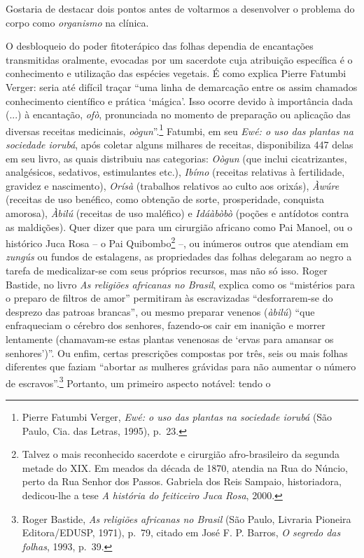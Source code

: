 Gostaria de destacar dois pontos antes de voltarmos a desenvolver o
problema do corpo como \emph{organismo} na clínica.

O desbloqueio do poder fitoterápico das folhas dependia de encantações
transmitidas oralmente, evocadas por um sacerdote cuja atribuição
específica é o conhecimento e utilização das espécies vegetais. É como
explica Pierre Fatumbi Verger: seria até difícil traçar ``uma linha de
demarcação entre os assim chamados conhecimento científico e prática
`mágica'. Isso ocorre devido à importância dada (...) à encantação,
\emph{ofò}, pronunciada no momento de preparação ou aplicação das
diversas receitas medicinais, \emph{oògun}''.\footnote{Pierre Fatumbi
  Verger, \emph{Ewé: o uso das plantas na sociedade iorubá} (São Paulo,
  Cia. das Letras, 1995), p.~23.} Fatumbi, em seu \emph{Ewé: o uso das
plantas na sociedade iorubá}, após coletar alguns milhares de receitas,
disponibiliza 447 delas em seu livro, as quais distribuiu nas
categorias: \emph{Oògun} (que inclui cicatrizantes, analgésicos,
sedativos, estimulantes etc.), \emph{Ibímo} (receitas relativas à
fertilidade, gravidez e nascimento), \emph{Orísà} (trabalhos relativos
ao culto aos orixás), \emph{Àwúre} (receitas de uso benéfico, como
obtenção de sorte, prosperidade, conquista amorosa), \emph{Àbilú}
(receitas de uso maléfico) e \emph{Idáàbòbò} (poções e antídotos contra
as maldições). Quer dizer que para um cirurgião africano como Pai
Manoel, ou o histórico Juca Rosa -- o Pai Quibombo\footnote{Talvez o
  mais reconhecido sacerdote e cirurgião afro-brasileiro da segunda
  metade do XIX. Em meados da década de 1870, atendia na Rua do Núncio,
  perto da Rua Senhor dos Passos. Gabriela dos Reis Sampaio,
  historiadora, dedicou-lhe a tese \emph{A história do feiticeiro Juca
  Rosa}, 2000.} --, ou inúmeros outros que atendiam em \emph{zungús} ou
fundos de estalagens, as propriedades das folhas delegaram ao negro a
tarefa de medicalizar-se com seus próprios recursos, mas não só isso.
Roger Bastide, no livro \emph{As religiões africanas no Brasil}, explica
como os ``mistérios para o preparo de filtros de amor'' permitiram às
escravizadas ``desforrarem-se do desprezo das patroas brancas'', ou
mesmo preparar venenos (\emph{àbilú}) ``que enfraqueciam o cérebro dos
senhores, fazendo-os cair em inanição e morrer lentamente (chamavam-se
estas plantas venenosas de `ervas para amansar os senhores')''. Ou
enfim, certas prescrições compostas por três, seis ou mais folhas
diferentes que faziam ``abortar as mulheres grávidas para não aumentar o
número de escravos''.\footnote{Roger Bastide, \emph{As religiões
  africanas no Brasil} (São Paulo, Livraria Pioneira Editora/EDUSP,
  1971), p.~79, citado em José F. P. Barros, \emph{O segredo das
  folhas}, 1993, p.~39.} Portanto, um primeiro aspecto notável: tendo o
